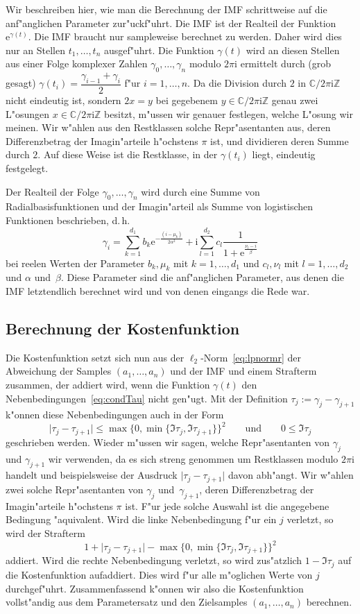 \documentclass[a4paper]{scrartcl}
\newcommand{\C}{{\mathbb{C}}}
\newcommand{\Z}{{\mathbb{Z}}}
\newcommand{\ee}{{\mathrm{e}}}
\newcommand{\ii}{{\mathrm{i}}}
\begin{document}
Wir beschreiben hier, wie man die Berechnung der IMF schrittweise auf die anf"anglichen Parameter zur"uckf"uhrt. 
Die IMF ist der Realteil der Funktion $\ee^{\gamma(t)}$. 
Die IMF braucht nur sampleweise berechnet zu werden. 
Daher wird dies nur an Stellen $t_1,\ldots,t_n$ ausgef"uhrt. 
Die Funktion $\gamma(t)$ wird an diesen Stellen aus einer Folge komplexer Zahlen $\gamma_0,\ldots,\gamma_n$ modulo $2\pi\ii$ ermittelt durch (grob gesagt) $\gamma(t_i)=\dfrac{\gamma_{i-1}+\gamma_{i}}{2}$ f"ur $i=1,\ldots,n$. 
Da die Division durch $2$ in $\C/2\pi\ii\Z$ nicht eindeutig ist, sondern $2x=y$ bei gegebenem $y\in\C/2\pi\ii\Z$ genau zwei L"osungen $x\in\C/2\pi\ii\Z$ besitzt, m"ussen wir genauer festlegen, welche L"osung wir meinen. 
Wir w"ahlen aus den Restklassen solche Repr"asentanten aus, deren Differenzbetrag der Imagin"arteile h"ochstens $\pi$ ist, und dividieren deren Summe durch $2$. 
Auf diese Weise ist die Restklasse, in der $\gamma(t_i)$ liegt, eindeutig festgelegt. 

Der Realteil der Folge $\gamma_0,\ldots,\gamma_n$ wird durch eine Summe von Radialbasisfunktionen und der Imagin"arteil als Summe von logistischen Funktionen beschrieben, d.\,h. 
$$ \gamma_i = \sum_{k=1}^{d_1}b_k\ee^{-\frac{(i-\mu_k)}{2\alpha^2}} + \ii\sum_{l=1}^{d_2}c_l\frac{1}{1+\ee^\frac{\nu_l-i}{\beta}} $$
bei reelen Werten der Parameter $b_k, \mu_k$ mit $k=1,\ldots,d_1$ und $c_l, \nu_l$ mit $l=1,\ldots,d_2$ und $\alpha$ und~$\beta$. 
Diese Parameter sind die anf"anglichen Parameter, aus denen die IMF letztendlich berechnet wird und von denen eingangs die Rede war. 


\subsection{Berechnung der Kostenfunktion}

Die Kostenfunktion setzt sich nun aus der $\ell_2$-Norm~\eqref{eq:lpnormr} der Abweichung der Samples $(a_1,\ldots,a_n)$ und der IMF und einem Strafterm zusammen, der addiert wird, wenn die Funktion $\gamma(t)$ den Nebenbedingungen~\eqref{eq:condTau} nicht gen"ugt. 
Mit der Definition
$ \tau_j := \gamma_j-\gamma_{j+1} $ 
k"onnen diese Nebenbedingungen auch in der Form 
$$ \lvert\tau_j-\tau_{j+1}\rvert \le \max\{0,\min\{\Im\tau_j,\Im\tau_{j+1}\}\}^2
\qquad \text{und} \qquad
0\le\Im\tau_j $$
geschrieben werden. 
Wieder m"ussen wir sagen, welche Repr"asentanten von $\gamma_j$ und $\gamma_{j+1}$ wir verwenden, da es sich streng genommen um Restklassen modulo $2\pi\ii$ handelt und beispielsweise der Ausdruck $\lvert\tau_j-\tau_{j+1}\rvert$ davon abh"angt. 
Wir w"ahlen zwei solche Repr"asentanten von $\gamma_j$ und~$\gamma_{j+1}$, deren Differenzbetrag der Imagin"arteile h"ochstens $\pi$ ist. 
F"ur jede solche Auswahl ist die angegebene Bedingung "aquivalent. 
Wird die linke Nebenbedingung f"ur ein $j$ verletzt, so wird der Strafterm
$$ 1 + \lvert\tau_j-\tau_{j+1}\rvert - \max\{0,\min\{\Im\tau_j,\Im\tau_{j+1}\}\}^2 $$
addiert. Wird die rechte Nebenbedingung verletzt, so wird zus"atzlich 
$ 1 - \Im\tau_j $
auf die Kostenfunktion aufaddiert. 
Dies wird f"ur alle m"oglichen Werte von $j$ durchgef"uhrt. 
Zusammenfassend k"onnen wir also die Kostenfunktion vollst"andig aus dem Parametersatz und den Zielsamples $(a_1,\ldots,a_n)$ berechnen. 
\end{document}
